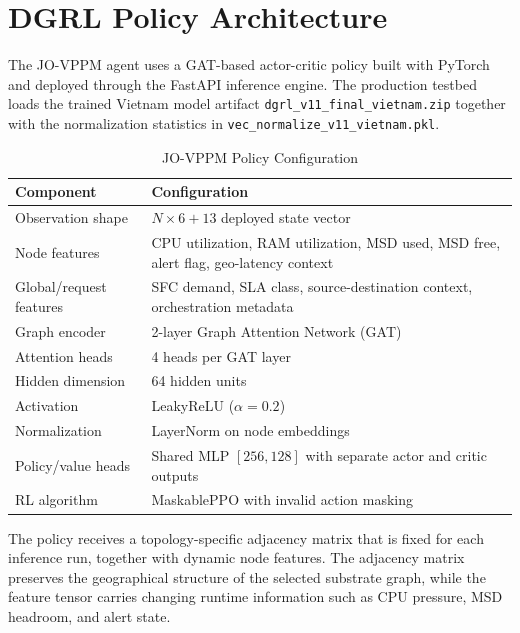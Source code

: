 \documentclass[12pt, a4paper, reqno, oneside]{book}
\begin{document}
\chapter{DGRL Policy Architecture}
\label{appendix:neural_arch}
The JO-VPPM agent uses a GAT-based actor-critic policy built with PyTorch and deployed through the FastAPI inference engine. The production testbed loads the trained Vietnam model artifact \texttt{dgrl\_v11\_final\_vietnam.zip} together with the normalization statistics in \texttt{vec\_normalize\_v11\_vietnam.pkl}.

\begin{table}[H]
\centering
\caption{JO-VPPM Policy Configuration}
\label{table:appendix_policy_config}
\small
\begin{tabular}{p{4.0cm}p{9.5cm}}
\toprule
\textbf{Component} & \textbf{Configuration} \\
\midrule
Observation shape & $N \times 6 + 13$ deployed state vector \\
Node features & CPU utilization, RAM utilization, MSD used, MSD free, alert flag, geo-latency context \\
Global/request features & SFC demand, SLA class, source-destination context, orchestration metadata \\
Graph encoder & 2-layer Graph Attention Network (GAT) \\
Attention heads & 4 heads per GAT layer \\
Hidden dimension & 64 hidden units \\
Activation & LeakyReLU ($\alpha=0.2$) \\
Normalization & LayerNorm on node embeddings \\
Policy/value heads & Shared MLP $[256, 128]$ with separate actor and critic outputs \\
RL algorithm & MaskablePPO with invalid action masking \\
\bottomrule
\end{tabular}
\end{table}

The policy receives a topology-specific adjacency matrix that is fixed for each inference run, together with dynamic node features. The adjacency matrix preserves the geographical structure of the selected substrate graph, while the feature tensor carries changing runtime information such as CPU pressure, MSD headroom, and alert state.
\end{document}
